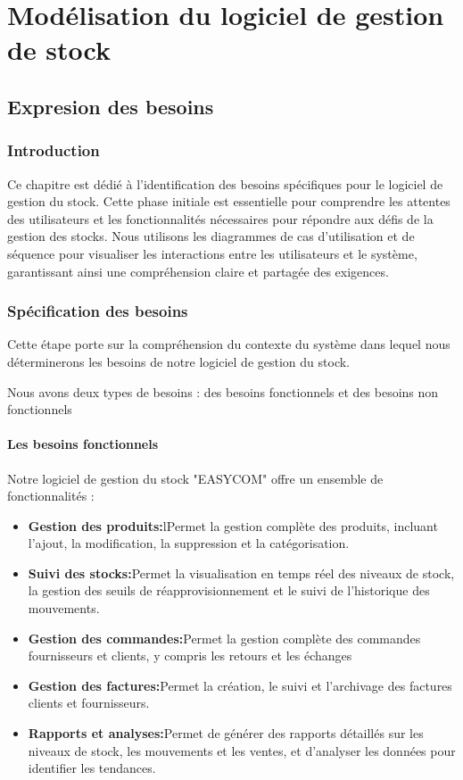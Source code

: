 \documentclass[edit,12pt,a4paper,ChapStyle,oneside,doubleinterligne]{report}
\begin{document}
\part{Modélisation du logiciel de gestion de stock}

\chapter{Expresion des besoins}
\section{Introduction}
Ce chapitre est dédié à l'identification des besoins spécifiques pour le logiciel de gestion du stock. Cette phase initiale est essentielle pour comprendre les attentes des utilisateurs et les fonctionnalités nécessaires pour répondre aux défis de la gestion des stocks. Nous utilisons les diagrammes de cas d'utilisation et de séquence pour visualiser les interactions entre les utilisateurs et le système, garantissant ainsi une compréhension claire et partagée des exigences.
\section{Spécification des besoins}
Cette étape porte sur la compréhension du contexte du système dans lequel nous déterminerons les besoins de notre logiciel de gestion du stock.

Nous avons deux types de besoins : des besoins fonctionnels et des besoins non fonctionnels

\subsection{Les besoins fonctionnels }
Notre logiciel de gestion du stock "EASYCOM" offre un ensemble de fonctionnalités :
\begin{itemize}
    \item \textbf{Gestion des produits:}lPermet la gestion complète des produits, incluant l'ajout, la modification, la suppression et la catégorisation.
    \item \textbf{Suivi des stocks:}Permet la visualisation en temps réel des niveaux de stock, la gestion des seuils de réapprovisionnement et le suivi de l'historique des mouvements.
    \item \textbf{Gestion des commandes:}Permet la gestion complète des commandes fournisseurs et clients, y compris les retours et les échanges
    \item \textbf{Gestion des factures:}Permet la création, le suivi et l'archivage des factures clients et fournisseurs.
    \item \textbf{Rapports et analyses:}Permet de générer des rapports détaillés sur les niveaux de stock, les mouvements et les ventes, et d'analyser les données pour identifier les tendances.
\end{itemize}
\end{document}
